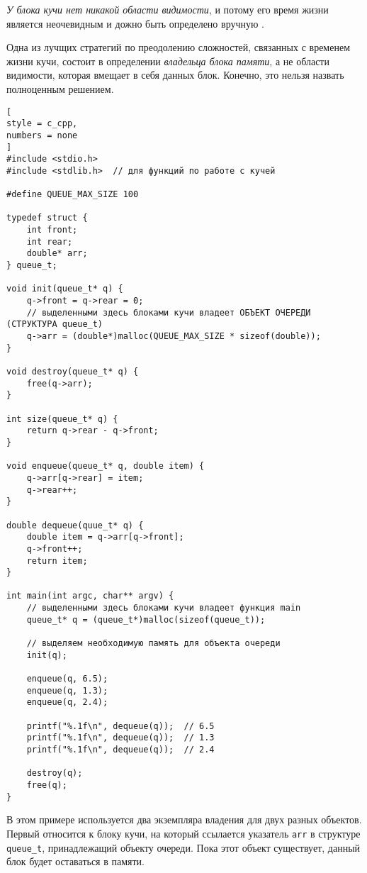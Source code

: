 \documentclass[%
	11pt,
	a4paper,
	utf8,
		]{article}
\begin{document}
\emph{У блока кучи нет никакой области видимости}, и потому его время жизни является неочевидным и дожно быть определено вручную \cite[]{amini-extreme-c:2022}.

Одна из лучщих стратегий по преодолению сложностей, связанных с временем жизни кучи, состоит в определении \emph{владельца блока памяти}, а не области видимости, которая вмещает в себя данных блок. Конечно, это нельзя назвать полноценным решением.

\begin{lstlisting}[
style = c_cpp,
numbers = none
]
#include <stdio.h>
#include <stdlib.h>  // для функций по работе с кучей

#define QUEUE_MAX_SIZE 100

typedef struct {
    int front;
    int rear;
    double* arr;
} queue_t;

void init(queue_t* q) {
    q->front = q->rear = 0;
    // выделенными здесь блоками кучи владеет ОБЪЕКТ ОЧЕРЕДИ (СТРУКТУРА queue_t)
    q->arr = (double*)malloc(QUEUE_MAX_SIZE * sizeof(double));
}

void destroy(queue_t* q) {
    free(q->arr);
}

int size(queue_t* q) {
    return q->rear - q->front;
}

void enqueue(queue_t* q, double item) {
    q->arr[q->rear] = item;
    q->rear++;
}

double dequeue(quue_t* q) {
    double item = q->arr[q->front];
    q->front++;
    return item;
}

int main(int argc, char** argv) {
	// выделенными здесь блоками кучи владеет функция main
    queue_t* q = (queue_t*)malloc(sizeof(queue_t));
    
    // выделяем необходимую память для объекта очереди
    init(q);
    
    enqueue(q, 6.5);
    enqueue(q, 1.3);
    enqueue(q, 2.4);
    
    printf("%.1f\n", dequeue(q));  // 6.5
    printf("%.1f\n", dequeue(q));  // 1.3
    printf("%.1f\n", dequeue(q));  // 2.4
    
    destroy(q);
    free(q);
}
\end{lstlisting}

В этом примере используется два экземпляра владения для двух разных объектов. Первый относится к блоку кучи, на который ссылается указатель \verb|arr| в структуре \verb|queue_t|, принадлежащий объекту очереди. Пока этот объект существует, данный блок будет оставаться в памяти.
\end{document}
